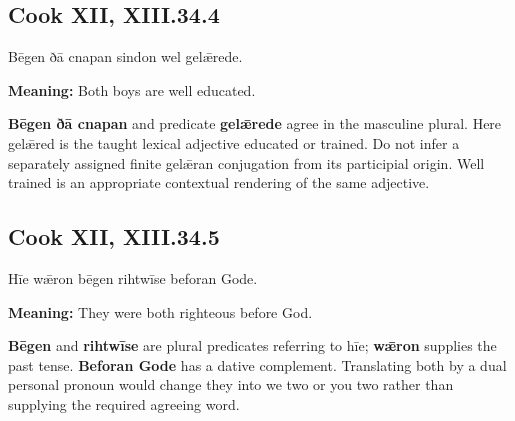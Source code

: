 \par\begin{minipage}{\linewidth}\raggedright
\subsection*{Cook XII, XIII.34.4}

Bēgen ðā cnapan sindon wel gelǣrede.

\textbf{Meaning:} Both boys are well educated.

\textbf{Bēgen ðā cnapan} and predicate \textbf{gelǣrede} agree in the masculine plural. Here gelǣred is the taught lexical adjective educated or trained. Do not infer a separately assigned finite gelǣran conjugation from its participial origin. Well trained is an appropriate contextual rendering of the same adjective.

\end{minipage}\par\addvspace{4pt}

\par\begin{minipage}{\linewidth}\raggedright
\subsection*{Cook XII, XIII.34.5}

Hīe wǣron bēgen rihtwīse beforan Gode.

\textbf{Meaning:} They were both righteous before God.

\textbf{Bēgen} and \textbf{rihtwīse} are plural predicates referring to hīe; \textbf{wǣron} supplies the past tense. \textbf{Beforan Gode} has a dative complement. Translating both by a dual personal pronoun would change they into we two or you two rather than supplying the required agreeing word.

\end{minipage}\par\addvspace{4pt}

